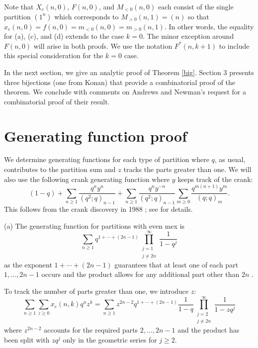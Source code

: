 \documentclass{amsart}
\theoremstyle{theorem}
\theoremstyle{definition}
\begin{document}
Note that $X_e(n,0)$, $F(n,0)$, and $M_{<0}(n,0)$ each consist of the single partition $(1^n)$ which corresponds to $M_{>0}(n,1) = (n)$ so that $x_e(n,0) = f(n,0) = m_{<0}(n,0) = m_{>0}(n,1)$.  In other words, the equality for (a), (c), and (d) extends to the case $k = 0$.  The minor exception around $F(n,0)$ will arise in both proofs.  We use the notation $F^*(n,k+1)$ to include this special consideration for the $k=0$ case.

In the next section, we give an analytic proof of Theorem \ref{big}.  Section 3 presents three bijections (one from Konan) that provide a combinatorial proof of the theorem.  We conclude with comments on Andrews and Newman's request for a combinatorial proof of their result.

\section{Generating function proof}

We determine generating functions for each type of partition where $q$, as usual, contributes to the partition sum and $z$ tracks the parts greater than one.  We will also use the following crank generating function where $y$ keeps track of the crank:
\begin{equation}
(1-q) + \sum_{n \ge 1} \frac{q^n y^n}{(q^2;q)_{n-1}} + \sum_{n \ge 1} \frac{q^n y^{-n}}{(q^2;q)_{n-1}} \sum_{m \ge 0} \frac{q^{m(n+1)} y^m}{(q;q)_m}. \label{cgf}
\end{equation}
This follows from the crank discovery in 1988 \cite{ag,g}; see \cite[\S2]{an25} for details.

(a) The generating function for partitions with even mex is
\[ \sum_{n \ge 1}q^{1+\cdots+(2n-1)} \prod_{\substack{j = 1 \\ j \ne 2n}}^\infty \frac{1}{1-q^j} \]
as the exponent $1 + \cdots + (2n-1)$ guarantees that at least one of each part $1, \ldots, 2n-1$ occurs and the product allows for any additional part other than $2n$ \cite{an20,hs20}.

To track the number of parts greater than one, we introduce $z$:
\[ \sum_{n \ge 1} \sum_{z \ge 0} x_e(n,k) q^n z^k = \sum_{n \ge 1}z^{2n-2} q^{1+\cdots+(2n-1)} \frac{1}{1-q} \prod_{\substack{j = 2 \\ j \ne 2n}}^\infty \frac{1}{1-zq^j} \]
where $z^{2n-2}$ accounts for the required parts $2, \ldots, 2n-1$ and the product has been split with $zq^j$ only in the geometric series for $j \ge 2$.
\end{document}

